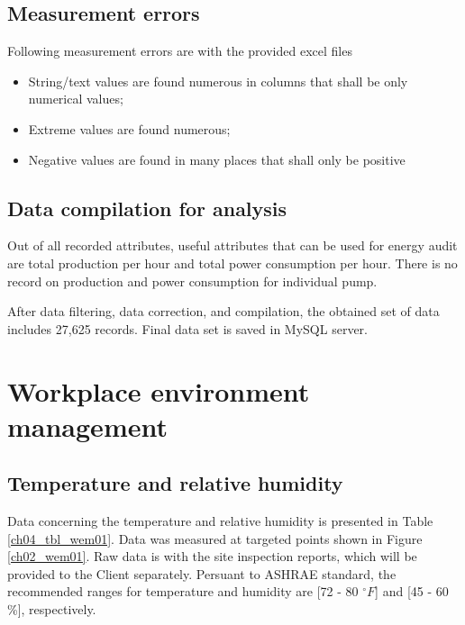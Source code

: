 \subsection{Measurement errors}
Following measurement errors are with the provided excel files
\begin{itemize}
\item String/text values are found numerous in columns that shall be only numerical values;
\item Extreme values are found numerous;
\item Negative values are found in many places that shall only be positive
\end{itemize}
\subsection{Data compilation for analysis}
Out of all recorded attributes, useful attributes that can be used for energy audit are total production per hour and total power consumption per hour. There is no record on production and power consumption for individual pump.

After data filtering, data correction, and compilation, the obtained set of data includes 27,625 records. Final data set is saved in MySQL server.

\section{Workplace environment management}
\label{47}

\subsection{Temperature and relative humidity}
Data concerning the temperature and relative humidity is presented in Table \ref{ch04_tbl_wem01}. Data was measured at targeted points shown in Figure \ref{ch02_wem01}. Raw data is with the site inspection reports, which will be provided to the Client separately. Persuant to ASHRAE standard, the recommended ranges for temperature and humidity are [72 - 80 $^\circ F$] and [45 - 60 \%], respectively.

